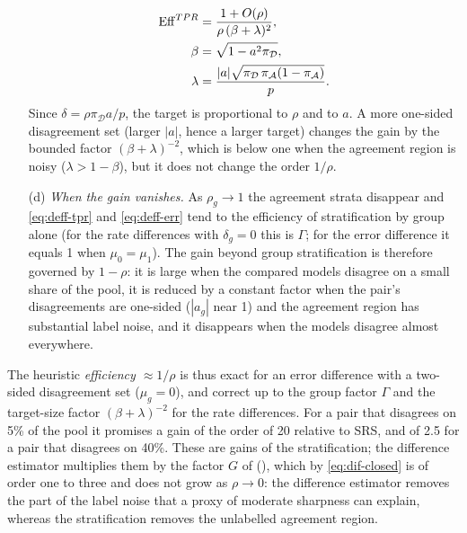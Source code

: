 \begin{corollary}
\begin{enumerate}
\begin{align}
\mathrm{Eff}^{TPR}&=\frac{1+O(\rho)}{\rho\,(\beta+\lambda)^2},\notag\\
\beta&=\sqrt{1-a^2\pi_{\mathcal D}},\notag\\
\lambda&=\frac{|a|\sqrt{\pi_{\mathcal D}\,\pi_{\mathcal A}(1-\pi_{\mathcal A})}}{p}.\label{eq:deff-lambda}
\end{align}
Since $\delta=\rho\pi_{\mathcal D}a/p$, the target is proportional to $\rho$ and to $a$. A more
one-sided disagreement set (larger $|a|$, hence a larger target) changes the gain by the bounded
factor $(\beta+\lambda)^{-2}$, which is below one when the agreement region is noisy
($\lambda>1-\beta$), but it does not change the order $1/\rho$.
\item[(d)] \emph{When the gain vanishes.} As $\rho_g\to1$ the agreement strata disappear and
\eqref{eq:deff-tpr} and \eqref{eq:deff-err} tend to the efficiency of stratification by
group alone (for the rate differences with $\delta_g=0$ this is $\Gamma$; for the error difference
it equals 1 when $\mu_0=\mu_1$). The gain beyond group stratification is therefore governed by $1-\rho$: it is large when
the compared models disagree on a small share of the pool, it is reduced by a constant factor
when the pair's disagreements are one-sided ($|a_g|$ near 1) and the agreement region has
substantial label noise, and it disappears when the models disagree almost everywhere.
\end{enumerate}
\end{corollary}

The heuristic \emph{efficiency $\approx1/\rho$} is thus exact for an error difference with a
two-sided disagreement set ($\mu_g=0$), and correct up to the group factor $\Gamma$ and the
target-size factor $(\beta+\lambda)^{-2}$ for the rate differences. For a pair that disagrees on
5\% of the pool it promises a gain of the order of 20 relative to SRS, and of 2.5 for a pair that
disagrees on 40\%. These are gains of the stratification; the difference estimator multiplies them by the factor $G$ of
(), which by \eqref{eq:dif-closed} is of order one to three and does not grow as $\rho\to0$: the difference estimator removes the part of the
label noise that a proxy of moderate sharpness can explain, whereas the stratification removes the unlabelled agreement region.

